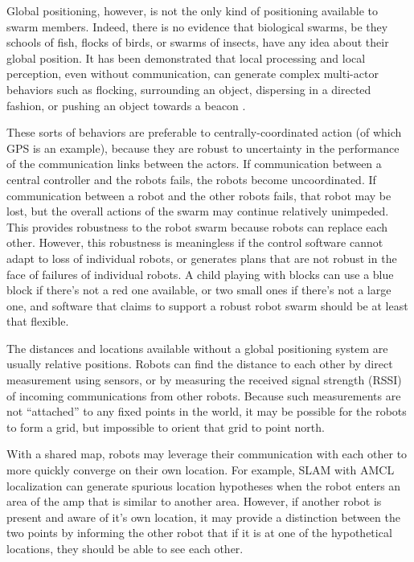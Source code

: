 \documentclass[]{article}
\begin{document}
Global positioning, however, is not the only kind of positioning available to swarm members. 
Indeed, there is no evidence that biological swarms, be they schools of fish, flocks of birds, or swarms of insects, have any idea about their global position. 
It has been demonstrated that local processing and local perception, even without communication, can generate complex multi-actor behaviors such as flocking, surrounding an object, dispersing in a directed fashion, or pushing an object towards a beacon \cite{mclurkin2004stupid, chen2015occlusion, reynolds1987flocks}.

These sorts of behaviors are preferable to centrally-coordinated action (of which GPS is an example), because they are robust to uncertainty in the performance of the communication links between the actors. 
If communication between a central controller and the robots fails, the robots become uncoordinated. 
If communication between a robot and the other robots fails, that robot may be lost, but the overall actions of the swarm may continue relatively unimpeded.  
This provides robustness to the robot swarm because robots can replace each other. 
However, this robustness is meaningless if the control software cannot adapt to loss of individual robots, or generates plans that are not robust in the face of failures of individual robots. 
A child playing with blocks can use a blue block if there's not a red one available, or two small ones if there's not a large one, and software that claims to support a robust robot swarm should be at least that flexible.


The distances and locations available without a global positioning system are usually relative positions. 
Robots can find the distance to each other by direct measurement using sensors, or by measuring the received signal strength (RSSI) of incoming communications from other robots.
Because such measurements are not ``attached'' to any fixed points in the world, it may be possible for the robots to form a grid, but impossible to orient that grid to point north. 

With a shared map, robots may leverage their communication with each other to more quickly converge on their own location. 
For example, SLAM with AMCL localization can generate spurious location hypotheses when the robot enters an area of the amp that is similar to another area. However, if another robot is present and aware of it's own location, it may provide a distinction between the two points by informing the other robot that if it is at one of the hypothetical locations, they should be able to see each other. 
\end{document}

